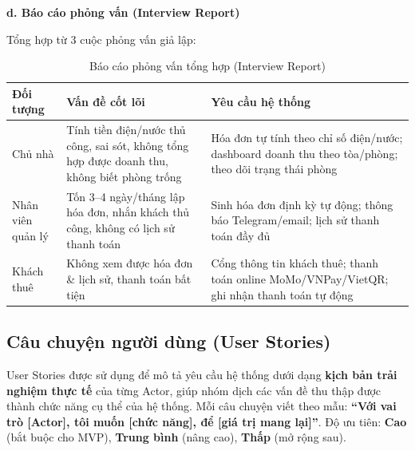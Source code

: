 \documentclass[12pt,a4paper]{report}
\begin{document}
\noindent\textbf{d. Báo cáo phỏng vấn (Interview Report)}

Tổng hợp từ 3 cuộc phỏng vấn giả lập:

\begin{table}[H]
  \centering
  \caption{Báo cáo phỏng vấn tổng hợp (Interview Report)}
  \label{tab:ig_int_report}
  \begin{tabular}{@{}p{3.2cm}p{5.4cm}p{5.4cm}@{}}
    \toprule
    \textbf{Đối tượng} & \textbf{Vấn đề cốt lõi} & \textbf{Yêu cầu hệ thống} \\
    \midrule
    Chủ nhà & Tính tiền điện/nước thủ công, sai sót, không tổng hợp được doanh thu, không biết phòng trống & Hóa đơn tự tính theo chỉ số điện/nước; dashboard doanh thu theo tòa/phòng; theo dõi trạng thái phòng \\
    \addlinespace
    Nhân viên quản lý & Tốn 3--4 ngày/tháng lập hóa đơn, nhắn khách thủ công, không có lịch sử thanh toán & Sinh hóa đơn định kỳ tự động; thông báo Telegram/email; lịch sử thanh toán đầy đủ \\
    \addlinespace
    Khách thuê & Không xem được hóa đơn \& lịch sử, thanh toán bất tiện & Cổng thông tin khách thuê; thanh toán online MoMo/VNPay/VietQR; ghi nhận thanh toán tự động \\
    \bottomrule
  \end{tabular}
\end{table}

\subsection{Câu chuyện người dùng (User Stories)}

User Stories được sử dụng để mô tả yêu cầu hệ thống dưới dạng \textbf{kịch bản trải nghiệm thực tế} của từng Actor, giúp nhóm dịch các vấn đề thu thập được thành chức năng cụ thể của hệ thống. Mỗi câu chuyện viết theo mẫu: \textbf{``Với vai trò [Actor], tôi muốn [chức năng], để [giá trị mang lại]''}. Độ ưu tiên: \textbf{Cao} (bắt buộc cho MVP), \textbf{Trung bình} (nâng cao), \textbf{Thấp} (mở rộng sau).
\end{document}
